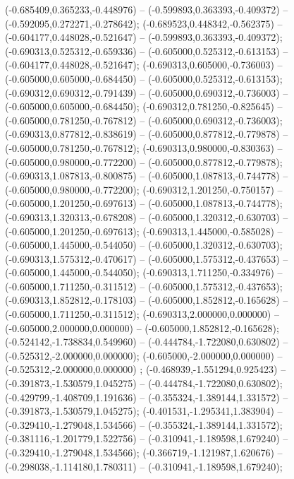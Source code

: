  (-0.685409,0.365233,-0.448976) -- (-0.599893,0.363393,-0.409372) -- (-0.592095,0.272271,-0.278642);
 (-0.689523,0.448342,-0.562375) -- (-0.604177,0.448028,-0.521647) -- (-0.599893,0.363393,-0.409372);
 (-0.690313,0.525312,-0.659336) -- (-0.605000,0.525312,-0.613153) -- (-0.604177,0.448028,-0.521647);
 (-0.690313,0.605000,-0.736003) -- (-0.605000,0.605000,-0.684450) -- (-0.605000,0.525312,-0.613153);
 (-0.690312,0.690312,-0.791439) -- (-0.605000,0.690312,-0.736003) -- (-0.605000,0.605000,-0.684450);
 (-0.690312,0.781250,-0.825645) -- (-0.605000,0.781250,-0.767812) -- (-0.605000,0.690312,-0.736003);
 (-0.690313,0.877812,-0.838619) -- (-0.605000,0.877812,-0.779878) -- (-0.605000,0.781250,-0.767812);
 (-0.690313,0.980000,-0.830363) -- (-0.605000,0.980000,-0.772200) -- (-0.605000,0.877812,-0.779878);
 (-0.690313,1.087813,-0.800875) -- (-0.605000,1.087813,-0.744778) -- (-0.605000,0.980000,-0.772200);
 (-0.690312,1.201250,-0.750157) -- (-0.605000,1.201250,-0.697613) -- (-0.605000,1.087813,-0.744778);
 (-0.690313,1.320313,-0.678208) -- (-0.605000,1.320312,-0.630703) -- (-0.605000,1.201250,-0.697613);
 (-0.690313,1.445000,-0.585028) -- (-0.605000,1.445000,-0.544050) -- (-0.605000,1.320312,-0.630703);
 (-0.690313,1.575312,-0.470617) -- (-0.605000,1.575312,-0.437653) -- (-0.605000,1.445000,-0.544050);
 (-0.690313,1.711250,-0.334976) -- (-0.605000,1.711250,-0.311512) -- (-0.605000,1.575312,-0.437653);
 (-0.690313,1.852812,-0.178103) -- (-0.605000,1.852812,-0.165628) -- (-0.605000,1.711250,-0.311512);
 (-0.690313,2.000000,0.000000) -- (-0.605000,2.000000,0.000000) -- (-0.605000,1.852812,-0.165628);
 (-0.524142,-1.738834,0.549960) -- (-0.444784,-1.722080,0.630802) -- (-0.525312,-2.000000,0.000000);
 (-0.605000,-2.000000,0.000000) -- (-0.525312,-2.000000,0.000000) ;
 (-0.468939,-1.551294,0.925423) -- (-0.391873,-1.530579,1.045275) -- (-0.444784,-1.722080,0.630802);
 (-0.429799,-1.408709,1.191636) -- (-0.355324,-1.389144,1.331572) -- (-0.391873,-1.530579,1.045275);
 (-0.401531,-1.295341,1.383904) -- (-0.329410,-1.279048,1.534566) -- (-0.355324,-1.389144,1.331572);
 (-0.381116,-1.201779,1.522756) -- (-0.310941,-1.189598,1.679240) -- (-0.329410,-1.279048,1.534566);
 (-0.366719,-1.121987,1.620676) -- (-0.298038,-1.114180,1.780311) -- (-0.310941,-1.189598,1.679240);
